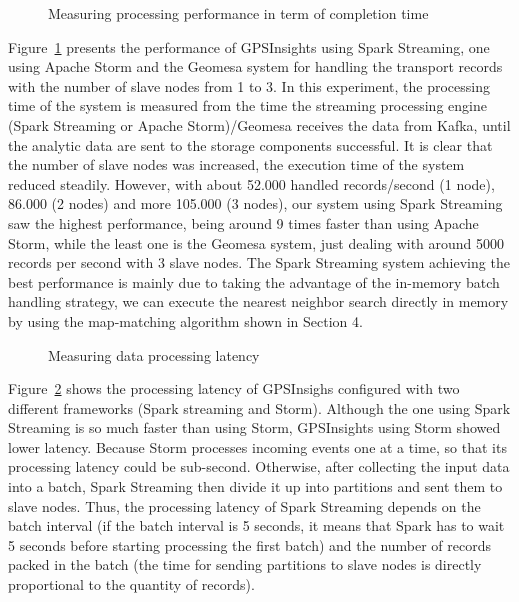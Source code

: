 \documentclass{acm_proc_article-sp}
\begin{document}
	
	\begin{figure}[h]
		\centering
		\caption{Measuring processing performance in term of completion time}
		\label{fig:performance}
	\end{figure}

Figure~\ref{fig:performance} presents the performance of GPSInsights using Spark Streaming, one using Apache Storm and the Geomesa system for handling the transport records with the number of slave nodes from 1 to 3. In this experiment, the processing time of the system is measured from the time the streaming processing engine (Spark Streaming or Apache Storm)/Geomesa receives the data from Kafka, until the analytic data are sent to the storage components successful. It is clear that the number of slave nodes was increased, the execution time of the system reduced steadily. However, with about 52.000 handled records/second (1 node), 86.000 (2 nodes) and more 105.000 (3 nodes), our system using Spark Streaming saw the highest performance, being around 9 times faster than using Apache Storm, while the least one is the Geomesa system, just dealing with around 5000 records per second with 3 slave nodes. The Spark Streaming system achieving the best performance is mainly due to taking the advantage of the in-memory batch handling strategy, we can execute the nearest neighbor search directly in memory by using the map-matching algorithm shown in Section 4.

	\begin{figure}[h]
		\centering
		\caption{Measuring data processing latency}
		\label{fig:timedelay}
	\end{figure}
	
Figure~\ref{fig:timedelay} shows the processing latency of GPSInsighs configured with two different frameworks (Spark streaming and Storm). Although the one using Spark Streaming is so much faster than using Storm, GPSInsights using Storm showed lower latency. Because Storm processes incoming events one at a time, so that its processing latency could be sub-second. Otherwise, after collecting the input data into a batch, Spark Streaming then divide it up into partitions and sent them to slave nodes. Thus, the processing latency of Spark Streaming depends on the batch interval (if the batch interval is 5 seconds, it means that Spark has to wait 5 seconds before starting processing the first batch)  and the number of records packed in the batch (the time for sending partitions to slave nodes is directly proportional to the quantity of records).
\end{document}
